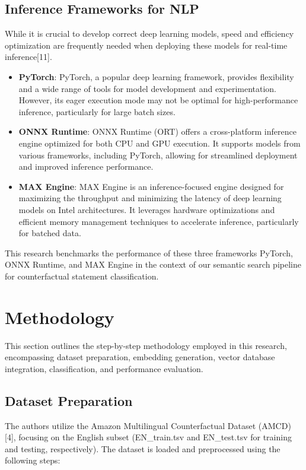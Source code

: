 \documentclass[conference]{IEEEtran}
\begin{document}
\subsection{Inference Frameworks for NLP}
While it is crucial to develop correct deep learning models, speed and efficiency optimization are frequently needed when deploying these models for real-time inference[11].

\begin{itemize}

    \item \textbf{PyTorch}: PyTorch, a popular deep learning framework, provides flexibility and a wide range of tools for model development and experimentation. However, its eager execution mode may not be optimal for high-performance inference, particularly for large batch sizes.

    \item \textbf{ONNX Runtime}: ONNX Runtime (ORT) offers a cross-platform inference engine optimized for both CPU and GPU execution. It supports models from various frameworks, including PyTorch, allowing for streamlined deployment and improved inference performance.

    \item \textbf{MAX Engine}: MAX Engine is an inference-focused engine designed for maximizing the throughput and minimizing the latency of deep learning models on Intel architectures. It leverages hardware optimizations and efficient memory management techniques to accelerate inference, particularly for batched data.

\end{itemize}

This research benchmarks the performance of these three frameworks PyTorch, ONNX Runtime, and MAX Engine in the context of our semantic search pipeline for counterfactual statement classification.

\section{Methodology}
This section outlines the step-by-step methodology employed in this research, encompassing dataset preparation, embedding generation, vector database integration, classification, and performance evaluation.

\subsection{Dataset Preparation}
The authors utilize the Amazon Multilingual Counterfactual Dataset (AMCD) [4], focusing on the English subset (EN\_train.tsv and EN\_test.tsv for training and testing, respectively). The dataset is loaded and preprocessed using the following steps:
\end{document}

